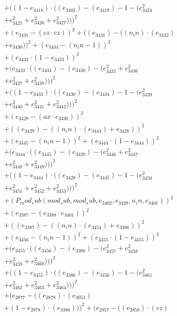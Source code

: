\documentclass[10pt, a4paper]{article}
\begin{document}
\begin{small}
\begin{align*}
& + ((1 - e_{3418})  \cdot  ((e_{3402}) - (e_{3419}) - 1 - (e_{3424}^{2} \\
& + e_{3425}^{2} + e_{3426}^{2} + e_{3427}^{2})))^{2} \\
& + (e_{3431} - (cz  \cdot  cz))^{2} + ((e_{3431}) - ((n_in)  \cdot  (e_{3432}) \\
& + e_{3430}))^{2} + (e_{3434} - (n_in - 1))^{2} \\
& + (e_{3433}  \cdot  (1 - e_{3433}))^{2} \\
& + (e_{3433}  \cdot  ((e_{3434}) - (e_{3430}) - (e_{3435}^{2} + e_{3436}^{2} \\
& + e_{3437}^{2} + e_{3438}^{2})))^{2} \\
& + ((1 - e_{3433})  \cdot  ((e_{3430}) - (e_{3434}) - 1 - (e_{3439}^{2} \\
& + e_{3440}^{2} + e_{3441}^{2} + e_{3442}^{2})))^{2} \\
& + (e_{3429} - (ax  \cdot  e_{3430}))^{2} \\
& + ((e_{3429}) - ((n_in)  \cdot  (e_{3443}) + e_{3428}))^{2} \\
& + (e_{3445} - (n_in - 1))^{2} + (e_{3444}  \cdot  (1 - e_{3444}))^{2} \\
& + (e_{3444}  \cdot  ((e_{3445}) - (e_{3428}) - (e_{3446}^{2} + e_{3447}^{2} \\
& + e_{3448}^{2} + e_{3449}^{2})))^{2} \\
& + ((1 - e_{3444})  \cdot  ((e_{3428}) - (e_{3445}) - 1 - (e_{3450}^{2} \\
& + e_{3451}^{2} + e_{3452}^{2} + e_{3453}^{2})))^{2} \\
& + (P_mod_sub(mod_sub, mod_sub, e_{3402}, e_{3428}, n_in, e_{3401}))^{2} \\
& + (e_{3387} - (e_{3388}  \cdot  e_{3401}))^{2} \\
& + ((e_{3387}) - ((n_in)  \cdot  (e_{3454}) + e_{3386}))^{2} \\
& + (e_{3456} - (n_in - 1))^{2} + (e_{3455}  \cdot  (1 - e_{3455}))^{2} \\
& + (e_{3455}  \cdot  ((e_{3456}) - (e_{3386}) - (e_{3457}^{2} + e_{3458}^{2} \\
& + e_{3459}^{2} + e_{3460}^{2})))^{2} \\
& + ((1 - e_{3455})  \cdot  ((e_{3386}) - (e_{3456}) - 1 - (e_{3461}^{2} \\
& + e_{3462}^{2} + e_{3463}^{2} + e_{3464}^{2})))^{2} \\
& + (e_{2877} - ((e_{2878})  \cdot  (e_{3053}) \\
& + (1 - e_{2878})  \cdot  (e_{3386})))^{2} + (e_{2857} - ((e_{2858})  \cdot  (cz) \\

\end{align*}
\end{small}
\end{document}
